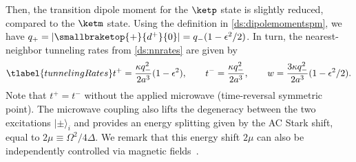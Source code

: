 Then, the transition dipole moment for the $\ketp$ state is slightly reduced, compared to the $\ketm$ state. Using the definition in \cref{ds:dipolemomentspm}, we have $q_+ = |\smallbraketop{+}{d^+}{0}|= q_- (1-\epsilon^2/2)$. In turn, the nearest-neighbor tunneling rates from \cref{ds:nnrates} are given by
\begin{align} \tlabel{tunnelingRates}
    t^+ = \frac{\kappa q_{-}^2}{2a^3} (1 - \epsilon^2),\qquad
    t^- = \frac{\kappa q_{-}^2}{2a^3},\qquad
    w = \frac{3 \kappa q_{-}^2}{2a^3} (1-\epsilon^2/2).
\end{align}
Note that $t^{+} = t^{-}$ without the applied microwave (time-reversal symmetric point).
The microwave coupling also lifts the degeneracy between the two excitations $|\pm\rangle_{i}$ and provides an energy splitting given by the AC Stark shift, equal to $2\mu \equiv \Omega^2/4\Delta$.
We remark that this energy shift $2\mu$ can also be independently controlled via magnetic fields~\cite{Ospelkaus2010,Yan2013}.


